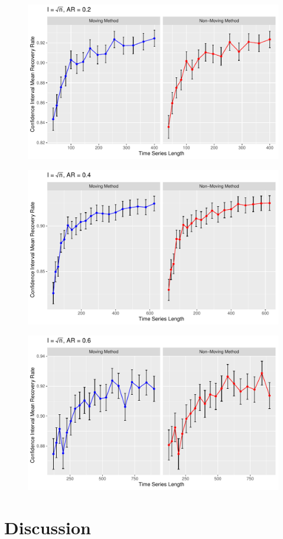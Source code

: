 \documentclass[12pt, letterpaper, titlepage]{article}
\begin{document}
\begin{figure}[tbp]
  \centering
  \includegraphics[width=\textwidth]{root_0.2}
  \caption{}
  \label{fig:root_0.2}
\end{figure}

\begin{figure}[tbp]
  \centering
  \includegraphics[width=\textwidth]{root_0.4}
  \caption{}
  \label{fig:root_0.4}
\end{figure}

\begin{figure}[tbp]
  \centering
  \includegraphics[width=\textwidth]{root_0.6}
  \caption{}
  \label{fig:root_0.6}
\end{figure}

\label{sec:results}




\section{Discussion}
\label{sec:discuss}





\end{document}
